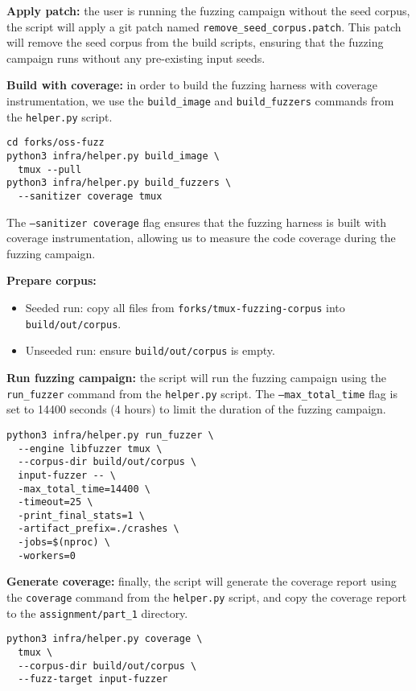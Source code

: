 \documentclass[11pt,a4paper,twocolumn]{article}
\begin{document}
\textbf{Apply patch:} the user is running the fuzzing campaign without the seed corpus, the script will apply a git patch named \texttt{remove\_seed\_corpus.patch}. This patch will remove the seed corpus from the build scripts, ensuring that the fuzzing campaign runs without any pre-existing input seeds.

\textbf{Build with coverage:} in order to build the fuzzing harness with coverage instrumentation, we use the \texttt{build\_image} and \texttt{build\_fuzzers} commands from the \texttt{helper.py} script.

\begin{verbatim}
cd forks/oss-fuzz
python3 infra/helper.py build_image \
  tmux --pull
python3 infra/helper.py build_fuzzers \
  --sanitizer coverage tmux
\end{verbatim}

The \texttt{--sanitizer coverage} flag ensures that the fuzzing harness is built with coverage instrumentation, allowing us to measure the code coverage during the fuzzing campaign.

\textbf{Prepare corpus:}

\begin{itemize}
	\item Seeded run: copy all files from \texttt{forks/tmux-fuzzing-corpus} into \texttt{build/out/corpus}.
	\item Unseeded run: ensure \texttt{build/out/corpus} is empty.
\end{itemize}

\textbf{Run fuzzing campaign:} the script will run the fuzzing campaign using the \texttt{run\_fuzzer} command from the \texttt{helper.py} script. The \texttt{---max\_total\_time} flag is set to 14400 seconds (4 hours) to limit the duration of the fuzzing campaign.

\begin{verbatim}
python3 infra/helper.py run_fuzzer \
  --engine libfuzzer tmux \
  --corpus-dir build/out/corpus \
  input-fuzzer -- \
  -max_total_time=14400 \
  -timeout=25 \
  -print_final_stats=1 \
  -artifact_prefix=./crashes \
  -jobs=$(nproc) \
  -workers=0
\end{verbatim}

\textbf{Generate coverage:} finally, the script will generate the coverage report using the \texttt{coverage} command from the \texttt{helper.py} script, and copy the coverage report to the \texttt{assignment/part\_1} directory.

\begin{verbatim}
python3 infra/helper.py coverage \
  tmux \
  --corpus-dir build/out/corpus \
  --fuzz-target input-fuzzer
\end{verbatim}
\end{document}
